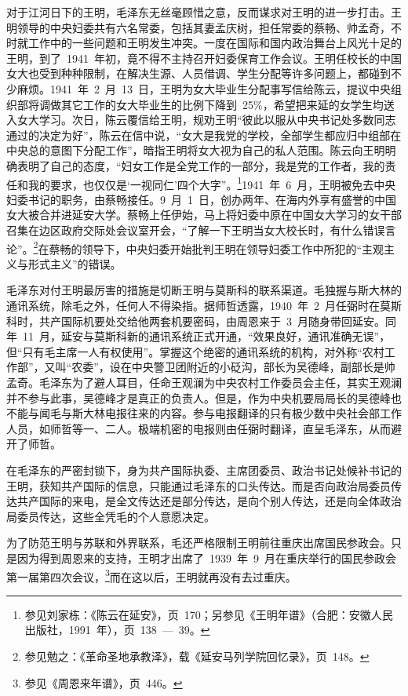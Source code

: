 对于江河日下的王明，毛泽东无丝毫顾惜之意，反而谋求对王明的进一步打击。王明领导的中央妇委共有六名常委，包括其妻孟庆树，担任常委的蔡畅、帅孟奇，不时就工作中的一些问题和王明发生冲突。一度在国际和国内政治舞台上风光十足的王明，到了~1941~年初，竟不得不主持召开妇委保育工作会议。王明任校长的中国女大也受到种种限制，在解决生源、人员借调、学生分配等许多问题上，都碰到不少麻烦。1941~年~2~月~13~日，王明为女大毕业生分配事写信给陈云，提议中央组织部将调做其它工作的女大毕业生的比例下降到~25\%，希望把来延的女学生均送入女大学习。次日，陈云覆信给王明，规劝王明“彼此以服从中央书记处多数同志通过的决定为好”，陈云在信中说，“女大是我党的学校，全部学生都应归中组部在中央总的意图下分配工作”，暗指王明将女大视为自己的私人范围。陈云向王明明确表明了自己的态度，“妇女工作是全党工作的一部分，我是党的工作者，我的责任和我的要求，也仅仅是‘一视同仁’四个大字”。\footnote{参见刘家栋：《陈云在延安》，页~170；另参见《王明年谱》（合肥：安徽人民出版社，1991~年），页~138~—~39。}1941~年~6~月，王明被免去中央妇委书记的职务，由蔡畅接任。9~月~1~日，创办两年、在海内外享有盛誉的中国女大被合并进延安大学。蔡畅上任伊始，马上将妇委中原在中国女大学习的女干部召集在边区政府交际处会议室开会，“了解一下王明当女大校长时，有什么错误言论”。\footnote{参见勉之：《革命圣地承教泽》，载《延安马列学院回忆录》，页~148。}在蔡畅的领导下，中央妇委开始批判王明在领导妇委工作中所犯的“主观主义与形式主义”的错误。

毛泽东对付王明最厉害的措施是切断王明与莫斯科的联系渠道。毛独握与斯大林的通讯系统，除毛之外，任何人不得染指。据师哲透露，1940~年~2~月任弼时在莫斯科时，共产国际机要处交给他两套机要密码，由周恩来于~3~月随身带回延安。同年~11~月，延安与莫斯科新的通讯系统正式开通，“效果良好，通讯准确无误”，但“只有毛主席一人有权使用”。掌握这个绝密的通讯系统的机构，对外称“农村工作部”，又叫“农委”，设在中央警卫团附近的小砭沟，部长为吴德峰，副部长是帅孟奇。毛泽东为了避人耳目，任命王观澜为中央农村工作委员会主任，其实王观澜并不参与此事，吴德峰才是真正的负责人。但是，作为中央机要局局长的吴德峰也不能与闻毛与斯大林电报往来的内容。参与电报翻译的只有极少数中央社会部工作人员，如师哲等一、二人。极端机密的电报则由任弼时翻译，直呈毛泽东，从而避开了师哲。

在毛泽东的严密封锁下，身为共产国际执委、主席团委员、政治书记处候补书记的王明，获知共产国际的信息，只能通过毛泽东的口头传达。而是否向政治局委员传达共产国际的来电，是全文传达还是部分传达，是向个别人传达，还是向全体政治局委员传达，这些全凭毛的个人意愿决定。

为了防范王明与苏联和外界联系，毛还严格限制王明前往重庆出席国民参政会。只是因为得到周恩来的支持，王明才出席了~1939~年~9~月在重庆举行的国民参政会第一届第四次会议，\footnote{参见《周恩来年谱》，页~446。}而在这以后，王明就再没有去过重庆。

